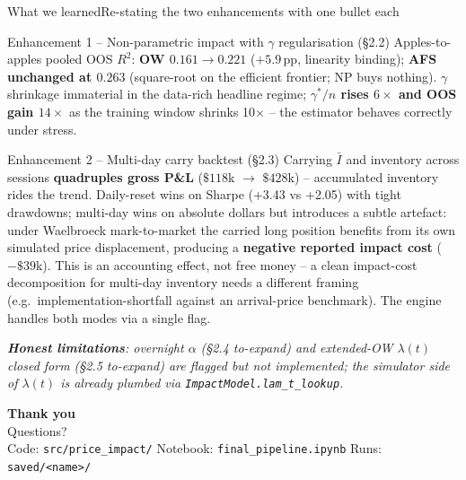 \documentclass[aspectratio=169,11pt]{beamer}
\newcommand{\hilite}[1]{\textcolor{accent}{\textbf{#1}}}
\newcommand{\warn}[1]{\textcolor{warm}{\textbf{#1}}}
\begin{document}
\begin{frame}{What we learned}{Re-stating the two enhancements with one bullet each}

  \begin{block}{Enhancement 1 -- Non-parametric impact with $\gamma$ regularisation \hfill (\S2.2)}
    \footnotesize
    Apples-to-apples pooled OOS $R^2$: \hilite{OW $0.161 \to 0.221$} ($+5.9$\,pp, linearity binding);\;
    \hilite{AFS unchanged at $0.263$} (square-root on the efficient frontier; NP buys nothing).\;
    $\gamma$ shrinkage immaterial in the data-rich headline regime; \hilite{$\gamma^*/n$ rises $6\times$ and OOS gain $14\times$} as the training window shrinks 10$\times$ -- the estimator behaves correctly under stress.
  \end{block}

  \begin{block}{Enhancement 2 -- Multi-day carry backtest \hfill (\S2.3)}
    \footnotesize
    Carrying $\bar I$ and inventory across sessions \hilite{quadruples gross P\&L} ($\$118$k $\to$ $\$428$k) -- accumulated inventory rides the trend. Daily-reset wins on Sharpe (+3.43 vs +2.05) with tight drawdowns; multi-day wins on absolute dollars but introduces a subtle artefact: under Waelbroeck mark-to-market the carried long position benefits from its own simulated price displacement, producing a \warn{negative reported impact cost} ($-\$39$k). This is an accounting effect, not free money -- a clean impact-cost decomposition for multi-day inventory needs a different framing (e.g.\ implementation-shortfall against an arrival-price benchmark). The engine handles both modes via a single flag.
  \end{block}

  \vspace{0.4em}
  \footnotesize\itshape
  \textbf{Honest limitations}: overnight $\alpha$ (\S2.4 \emph{to-expand}) and extended-OW $\lambda(t)$ closed form (\S2.5 \emph{to-expand}) are flagged but not implemented; the simulator side of $\lambda(t)$ is already plumbed via \texttt{ImpactModel.lam\_t\_lookup}.
\end{frame}

\begin{frame}[plain]
  \vfill
  \centering
  {\Huge\bfseries Thank you}\\[1em]
  {\large Questions?}\\[2em]
  \footnotesize
  Code: \texttt{src/price\_impact/} \;\;\textbar\;\;
  Notebook: \texttt{final\_pipeline.ipynb} \;\;\textbar\;\;
  Runs: \texttt{saved/<name>/}
  \vfill
\end{frame}
\end{document}
